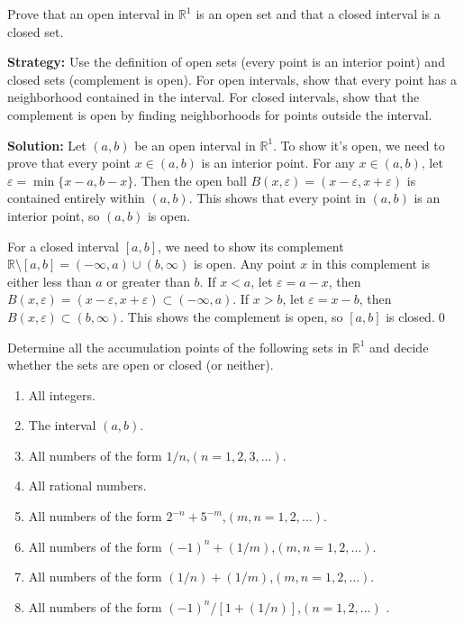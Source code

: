 \begin{problembox}
\begin{problemstatement}
Prove that an open interval in $\mathbb{R}^1$ is an open set and that a closed interval is a closed set.
\end{problemstatement}
\end{problembox}

\noindent\textbf{Strategy:} Use the definition of open sets (every point is an interior point) and closed sets (complement is open). For open intervals, show that every point has a neighborhood contained in the interval. For closed intervals, show that the complement is open by finding neighborhoods for points outside the interval.

\bigskip\noindent\textbf{Solution:} Let $(a,b)$ be an open interval in $\mathbb{R}^1$. To show it's open, we need to prove that every point $x \in (a,b)$ is an interior point. For any $x \in (a,b)$, let $\varepsilon = \min\{x-a, b-x\}$. Then the open ball $B(x,\varepsilon) = (x-\varepsilon, x+\varepsilon)$ is contained entirely within $(a,b)$. This shows that every point in $(a,b)$ is an interior point, so $(a,b)$ is open.

For a closed interval $[a,b]$, we need to show its complement $\mathbb{R} \setminus [a,b] = (-\infty,a) \cup (b,\infty)$ is open. Any point $x$ in this complement is either less than $a$ or greater than $b$. If $x < a$, let $\varepsilon = a-x$, then $B(x,\varepsilon) = (x-\varepsilon, x+\varepsilon) \subset (-\infty,a)$. If $x > b$, let $\varepsilon = x-b$, then $B(x,\varepsilon) \subset (b,\infty)$. This shows the complement is open, so $[a,b]$ is closed.\qed


\begin{problembox}
\begin{problemstatement}
Determine all the accumulation points of the following sets in $\mathbb{R}^1$ and decide whether the sets are open or closed (or neither).
\begin{enumerate}[label=\textbf{(\alph*)}]
\item All integers.
\item The interval $(a, b)$.
\item All numbers of the form $1/n$,\quad $(n = 1, 2, 3, \dots)$.
\item All rational numbers.
\item All numbers of the form $2^{-n} + 5^{-m}$,\quad $(m, n = 1, 2, \dots)$.
\item All numbers of the form $(-1)^n + (1/m)$,\quad $(m, n = 1, 2, \dots)$.
\item All numbers of the form $(1/n) + (1/m)$,\quad $(m, n = 1, 2, \dots)$.
\item All numbers of the form $(-1)^n / [1 + (1/n)]$,\quad $(n = 1, 2, \dots)$
.
\end{enumerate}
\end{problemstatement}
\end{problembox}

